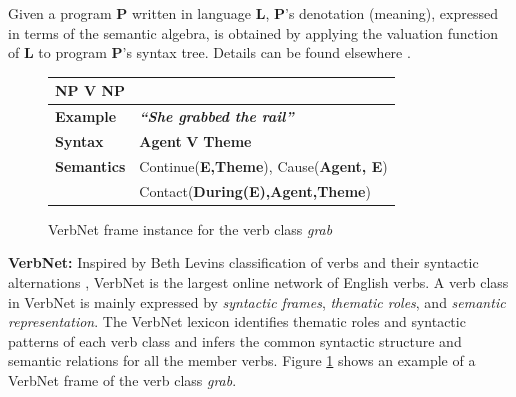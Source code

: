 \documentclass[letterpaper]{article}
\begin{document}
\noindent Given a program \textbf{P} written in language \textbf{L}, \textbf{P}'s denotation (meaning), expressed in terms of the semantic algebra, is obtained by applying the valuation function of \textbf{L} to program \textbf{P}'s syntax tree. Details can be found elsewhere \cite{d_semantics}.

\begin{figure}[t]
\tiny
\centering
\begin{tabular}{|p{1.2cm}|p{6cm}|}
    \hline
     \multicolumn{2}{|l|}{\textbf{NP V NP}}   \\
    \hline
    \textbf{Example}  & \textbf{\textit{``She grabbed the rail''}} \\
    \hline
    \textbf{Syntax}  & \textbf{Agent} \textbf{V} \textbf{Theme}  \\
    \hline
    \textbf{Semantics}  & \textcolor{burgundy}{Continue(}\textbf{E,Theme}\textcolor{burgundy}{)}, \textcolor{burgundy}{Cause(}\textbf{Agent, E}\textcolor{burgundy}{)}\\
    & \textcolor{burgundy}{Contact(}\textbf{During(E),Agent,Theme}\textcolor{burgundy}{)} \\
    \hline
\end{tabular}
\caption{VerbNet frame instance for the verb class \textit{grab}}
    \label{fig:verbnet-example}
\end{figure}

\medskip

\noindent\textbf{VerbNet:}
Inspired by Beth Levins classification of verbs and their syntactic alternations \cite{verbclasses}, VerbNet \cite{vn} is the largest online network of English verbs. A verb class in VerbNet is mainly expressed by \textit{syntactic frames}, \textit{thematic roles},  and  \textit{semantic representation}. The VerbNet
lexicon identifies  thematic roles and  syntactic patterns of each verb class and infers the common syntactic structure and semantic relations for all the member verbs. Figure \ref{fig:verbnet-example} shows an example of a VerbNet frame of the verb class \textit{grab}.

\end{document}
